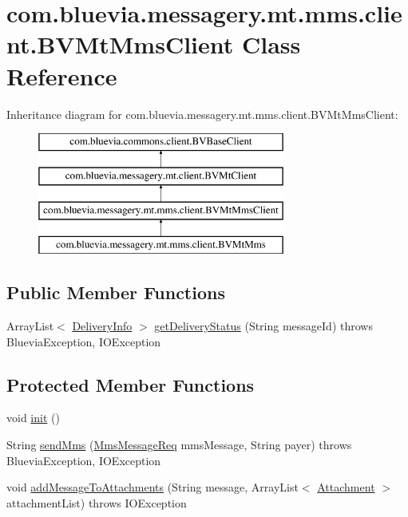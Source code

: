 \hypertarget{classcom_1_1bluevia_1_1messagery_1_1mt_1_1mms_1_1client_1_1BVMtMmsClient}{
\section{com.bluevia.messagery.mt.mms.client.BVMtMmsClient Class Reference}
\label{classcom_1_1bluevia_1_1messagery_1_1mt_1_1mms_1_1client_1_1BVMtMmsClient}
}
Inheritance diagram for com.bluevia.messagery.mt.mms.client.BVMtMmsClient:\begin{figure}[H]
\begin{center}
\leavevmode
\includegraphics[height=4.000000cm]{classcom_1_1bluevia_1_1messagery_1_1mt_1_1mms_1_1client_1_1BVMtMmsClient}
\end{center}
\end{figure}
\subsection*{Public Member Functions}
\begin{DoxyCompactItemize}
\item 
ArrayList$<$ \hyperlink{classcom_1_1bluevia_1_1messagery_1_1mt_1_1data_1_1DeliveryInfo}{DeliveryInfo} $>$ \hyperlink{classcom_1_1bluevia_1_1messagery_1_1mt_1_1mms_1_1client_1_1BVMtMmsClient_aa57d8a5c364299801600dc7f09ed84e7}{getDeliveryStatus} (String messageId)  throws BlueviaException, IOException 
\end{DoxyCompactItemize}
\subsection*{Protected Member Functions}
\begin{DoxyCompactItemize}
\item 
void \hyperlink{classcom_1_1bluevia_1_1messagery_1_1mt_1_1mms_1_1client_1_1BVMtMmsClient_a5269e29d42fae3d08159cc84902385d7}{init} ()
\item 
String \hyperlink{classcom_1_1bluevia_1_1messagery_1_1mt_1_1mms_1_1client_1_1BVMtMmsClient_a0afa0bbcf8db2ffcd12b84729a97772a}{sendMms} (\hyperlink{classcom_1_1bluevia_1_1messagery_1_1mt_1_1mms_1_1data_1_1MmsMessageReq}{MmsMessageReq} mmsMessage, String payer)  throws BlueviaException, IOException 
\item 
void \hyperlink{classcom_1_1bluevia_1_1messagery_1_1mt_1_1mms_1_1client_1_1BVMtMmsClient_a44458b910b1c64864ed84aaa18df4cf1}{addMessageToAttachments} (String message, ArrayList$<$ \hyperlink{classcom_1_1bluevia_1_1messagery_1_1mt_1_1mms_1_1data_1_1Attachment}{Attachment} $>$ attachmentList)  throws IOException
\end{DoxyCompactItemize}


